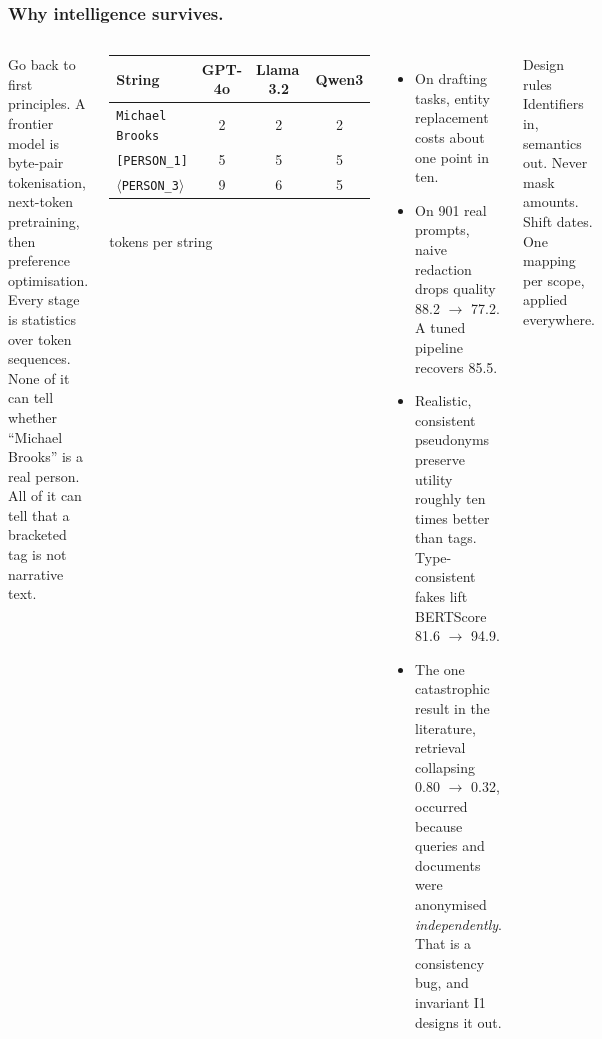 \documentclass[aspectratio=169,10pt]{beamer}
\newcommand{\slideeyebrow}{}
\newcommand{\slide}[2]{\renewcommand{\slideeyebrow}{#1}\frametitle{#2}}
\begin{document}
\begin{frame}[shrink=20]
\slide{05}{Why intelligence survives.}
\begin{columns}[T]
Go back to first principles. A frontier model is byte-pair tokenisation, next-token pretraining, then preference optimisation. Every stage is statistics over token sequences. None of it can tell whether ``Michael Brooks'' is a real person. All of it can tell that a bracketed tag is not narrative text.
\vspace{3mm}
\begin{center}\footnotesize
\begin{tabular}{@{}lccc@{}}
\toprule
String & GPT-4o & Llama\,3.2 & Qwen3 \\
\midrule
\texttt{Michael Brooks} & 2 & 2 & 2 \\
\texttt{[PERSON\_1]} & 5 & 5 & 5 \\
\texttt{$\langle$PERSON\_3$\rangle$} & 9 & 6 & 5 \\
\bottomrule
\end{tabular}\\[2pt]{\fontsize{6}{7.5}\selectfont tokens per string}
\end{center}
\begin{itemize}
\item On drafting tasks, entity replacement costs about one point in ten.
\item On 901 real prompts, naive redaction drops quality 88.2 $\to$ 77.2. A tuned pipeline recovers 85.5.
\item Realistic, consistent pseudonyms preserve utility roughly ten times better than tags. Type-consistent fakes lift BERTScore 81.6 $\to$ 94.9.
\item The one catastrophic result in the literature, retrieval collapsing 0.80 $\to$ 0.32, occurred because queries and documents were anonymised \emph{independently}. That is a consistency bug, and invariant I1 designs it out.
\end{itemize}
\vspace{1mm}
\begin{callout}[teal]{Design rules}
Identifiers in, semantics out. Never mask amounts. Shift dates. One mapping per scope, applied everywhere.
\end{callout}
\end{columns}
\end{frame}
\end{document}
